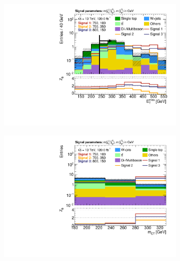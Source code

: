 \begin{figure}
	\centering
	\begin{subfigure}[b]{0.45\linewidth}
		\centering\includegraphics[width=\textwidth]{n1_SRHM_mct_bins/met.pdf}
		\vspace{-2em}
		\caption{\label{fig:Wh_reopt_second_round_n1_srhm_met}}
	\end{subfigure}%
	\begin{subfigure}[b]{0.45\linewidth}
		\centering\includegraphics[width=\textwidth]{n1_SRHM_mct_bins/mct.pdf}
		\vspace{-2em}
		\caption{\label{fig:Wh_reopt_second_round_n1_srhm_mct}}
	\end{subfigure}
	\par\medskip
	\begin{subfigure}[b]{0.45\linewidth}

\end{subfigure}
\end{figure}
